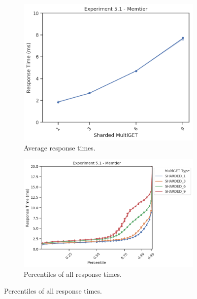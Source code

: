        \begin{figure}
            \vspace*{-.5\baselineskip}
                \centering
            \begin{subfigure}[t!]{0.43\textwidth}
                \centering
                \includegraphics[width=\textwidth]{../data_analysis/figures/5-1_mt_response-time.png}
                \caption{Average response times.\label{fig:shard_mt_rt}}
            \end{subfigure}
            \begin{subfigure}[t!]{0.56\textwidth}
                \centering
                \includegraphics[width=\textwidth]{../data_analysis/figures/5-1_mt_percentiles.png}
                \caption{Percentiles of all response times.\label{fig:shard_mt_rt_percentiles}}

\end{subfigure}
\end{figure}
